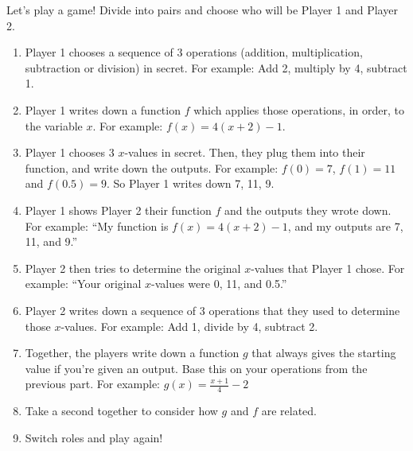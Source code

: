 \documentclass[noauthor,noinstructornotes]{ximera}
\begin{document}
\begin{problem}
Let's play a game! Divide into pairs and choose who will be
Player 1 and Player 2. 

\begin{enumerate}
    \item Player 1 chooses a sequence of 3 operations (addition, 
    multiplication, subtraction or division) in secret. For example: Add 2, multiply by 4, subtract 1.
    \item Player 1 writes down a function \(f\) which applies those operations,
    in order, to the variable \(x\). For example: \(f(x) = 4(x + 2) - 1\).
    \item Player 1 chooses 3 \(x\)-values in secret. Then, they plug them into their function,
    and write down the outputs. For example: \(f(0) = 7\), \(f(1) = 11\) and \(f(0.5) = 9\). So Player 1
        writes down 7, 11, 9.
    \item Player 1 shows Player 2 their function \(f\) and the outputs they wrote down.
    For example: ``My function is \(f(x) = 4(x + 2) - 1\), and my outputs are 7, 11, and 9.''
    \item Player 2 then tries to determine the original \(x\)-values that
    Player 1 chose. For example: ``Your original \(x\)-values were 0, 11, and 0.5.''
    \item Player 2 writes down a sequence of 3 operations that they
    used to determine those \(x\)-values. For example: Add 1, divide by 4, subtract 2.
    \item Together, the players write down a function \(g\) that always gives the 
    starting value if you're given an output. Base this on your operations
    from the previous part. For example: \(g(x) = \frac{x + 1}{4} - 2\)
    \item Take a second together to consider how \(g\) and \(f\) are related. 
    \item Switch roles and play again!
\end{enumerate}
\end{problem}
\end{document}
